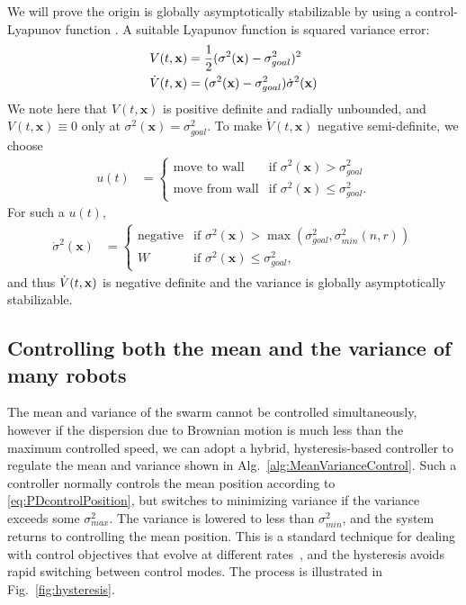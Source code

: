 We will prove the origin is globally asymptotically stabilizable by using a control-Lyapunov function \cite{Lyapunov1992}.  A suitable Lyapunov function is squared variance error:
\begin{align}
\label{eq:LyapunovVariance}
V(t,\bf{x})  &= \frac{1}{2} (\sigma^2(\mathbf{x}) - \sigma^2_{goal})^2\\
\dot{V}(t,\bf{x}) &= (\sigma^2(\mathbf{x})-\sigma^2_{goal})\dot{\sigma}^2(\mathbf{x})
\end{align}
We note here that $V(t,\mathbf{x})$ is positive definite and radially unbounded, and $V(t,\mathbf{x}) \equiv 0$ only at $\sigma^2(\mathbf{x}) = \sigma^2_{goal}$.
To make $\dot{V}(t,\mathbf{x})$ negative semi-definite, we choose
\begin{align}
u(t) &=   \begin{cases}
	 \mbox{move to wall} &\mbox{if } \sigma^2(\mathbf{x})>\sigma^2_{goal} \\ 
	 \mbox{move from wall} & \mbox{if } \sigma^2(\mathbf{x}) \le \sigma^2_{goal}.
\end{cases} 
\end{align}
 For such a $u(t)$,
 \begin{align}
\dot{\sigma}^2(\mathbf{x}) &=   \begin{cases}
	 \mbox{negative} &\mbox{if } \sigma^2(\mathbf{x})> \max(\sigma^2_{goal}, \sigma^2_{min}(n,r))  \\ 
	 W & \mbox{if } \sigma^2(\mathbf{x}) \le \sigma^2_{goal},
\end{cases} 
\end{align} and thus
$\dot{V}(t,{\bf x})$ is negative definite and the variance is globally asymptotically stabilizable.





\subsection{Controlling both the mean and the variance of many robots}

The mean and variance of the swarm cannot be controlled simultaneously, however if the dispersion due to Brownian motion is much less than the maximum controlled speed, we can adopt a hybrid, hysteresis-based controller to regulate the mean and variance shown in Alg.~\ref{alg:MeanVarianceControl}.  Such a controller normally controls the mean position according to \eqref{eq:PDcontrolPosition}, but switches to minimizing variance if the variance exceeds some $\sigma_{max}^2$.  The variance is lowered to less than $\sigma_{min}^2$, and the system returns to controlling the mean position. This is a standard technique for dealing with control objectives that evolve at different rates~\cite{Sadraddini2015,kloetzer2007temporal}, and the hysteresis avoids rapid switching between control modes. The process is illustrated in Fig.~\ref{fig:hysteresis}. 


